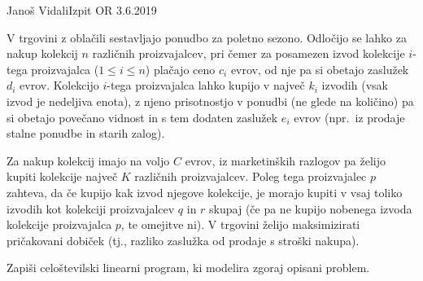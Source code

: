 \begin{naloga}{Janoš Vidali}{Izpit OR 3.6.2019}
\begin{vprasanje}
V trgovini z oblačili sestavljajo ponudbo za poletno sezono.
Odločijo se lahko za nakup kolekcij $n$ različnih proizvajalcev,
pri čemer za posamezen izvod kolekcije $i$-tega proizvajalca ($1 \le i \le n$)
plačajo ceno $c_i$ evrov,
od nje pa si obetajo zaslužek $d_i$ evrov.
Kolekcijo $i$-tega proizvajalca lahko kupijo v največ $k_i$ izvodih
(vsak izvod je nedeljiva enota),
z njeno prisotnostjo v ponudbi (ne glede na količino)
pa si obetajo povečano vidnost in s tem dodaten zaslužek $e_i$ evrov
(npr.~iz prodaje stalne ponudbe in starih zalog).

Za nakup kolekcij imajo na voljo $C$ evrov,
iz marketinških razlogov pa želijo kupiti
kolekcije največ $K$ različnih proizvajalcev.
Poleg tega proizvajalec $p$ zahteva,
da če kupijo kak izvod njegove kolekcije,
je morajo kupiti v vsaj toliko izvodih
kot kolekciji proizvajalcev $q$ in $r$ skupaj
(če pa ne kupijo nobenega izvoda kolekcije proizvajalca $p$, te omejitve ni).
V trgovini želijo maksimizirati pričakovani dobiček
(tj., razliko zaslužka od prodaje s stroški nakupa).

Zapiši celoštevilski linearni program, ki modelira zgoraj opisani problem.
\end{vprasanje}

\begin{odgovor}
\end{odgovor}
\end{naloga}
